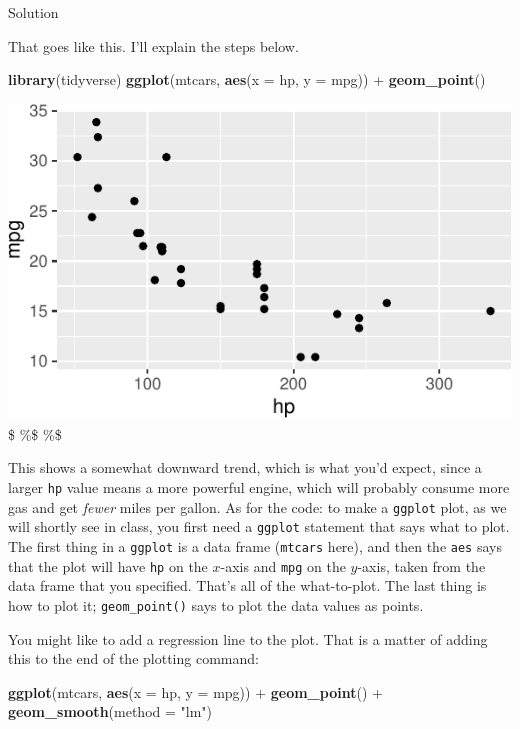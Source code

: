 \documentclass[]{tufte-book}
\newenvironment{Shaded}{}{}
\newcommand{\DataTypeTok}[1]{\textcolor[rgb]{0.56,0.13,0.00}{#1}}
\newcommand{\KeywordTok}[1]{\textcolor[rgb]{0.00,0.44,0.13}{\textbf{#1}}}
\newcommand{\NormalTok}[1]{#1}
\newcommand{\OperatorTok}[1]{\textcolor[rgb]{0.40,0.40,0.40}{#1}}
\newcommand{\StringTok}[1]{\textcolor[rgb]{0.25,0.44,0.63}{#1}}
\theoremstyle{definition}
\theoremstyle{definition}
\theoremstyle{definition}
\theoremstyle{remark}
\begin{document}
Solution

That goes like this. I'll explain the steps below.

\begin{Shaded}
\begin{Highlighting}[]
\KeywordTok{library}\NormalTok{(tidyverse)}
\KeywordTok{ggplot}\NormalTok{(mtcars, }\KeywordTok{aes}\NormalTok{(}\DataTypeTok{x =}\NormalTok{ hp, }\DataTypeTok{y =}\NormalTok{ mpg)) }\OperatorTok{+}\StringTok{ }\KeywordTok{geom_point}\NormalTok{()}
\end{Highlighting}
\end{Shaded}

\includegraphics{01-getting-used_files/figure-latex/unnamed-chunk-9-1}
\$ \%\$ \%\$

This shows a somewhat downward trend, which is what you'd expect, since
a larger \texttt{hp} value means a more powerful engine, which will
probably consume more gas and get \emph{fewer} miles per gallon. As for
the code: to make a \texttt{ggplot} plot, as we will shortly see in
class, you first need a \texttt{ggplot} statement that says what to
plot. The first thing in a \texttt{ggplot} is a data frame
(\texttt{mtcars} here), and then the \texttt{aes} says that the plot
will have \texttt{hp} on the \(x\)-axis and \texttt{mpg} on the
\(y\)-axis, taken from the data frame that you specified. That's all of
the what-to-plot. The last thing is how to plot it;
\texttt{geom\_point()} says to plot the data values as points.

You might like to add a regression line to the plot. That is a matter of
adding this to the end of the plotting command:

\begin{Shaded}
\begin{Highlighting}[]
\KeywordTok{ggplot}\NormalTok{(mtcars, }\KeywordTok{aes}\NormalTok{(}\DataTypeTok{x =}\NormalTok{ hp, }\DataTypeTok{y =}\NormalTok{ mpg)) }\OperatorTok{+}\StringTok{ }\KeywordTok{geom_point}\NormalTok{() }\OperatorTok{+}\StringTok{ }
\StringTok{    }\KeywordTok{geom_smooth}\NormalTok{(}\DataTypeTok{method =} \StringTok{"lm"}\NormalTok{)}
\end{Highlighting}
\end{Shaded}
\end{document}
